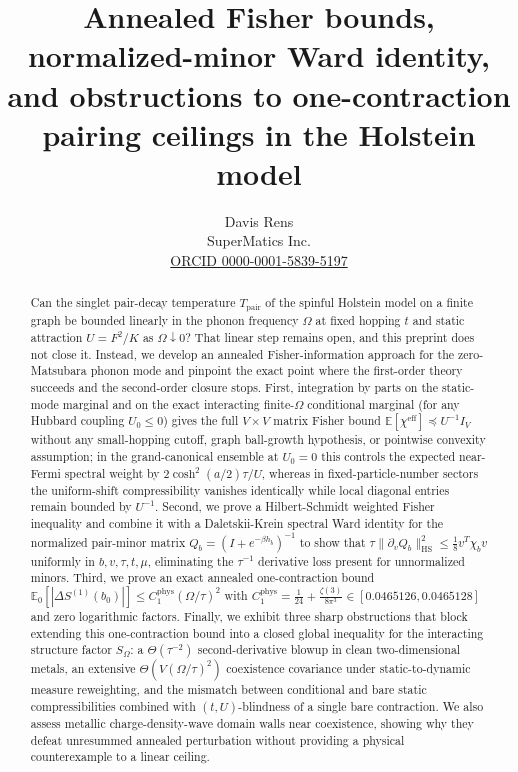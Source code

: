 \documentclass[11pt]{article}
\title{Annealed Fisher bounds, normalized-minor Ward identity, and obstructions to one-contraction pairing ceilings in the Holstein model}
\author{Davis Rens\\SuperMatics Inc.\\\href{https://orcid.org/0000-0001-5839-5197}{ORCID 0000-0001-5839-5197}}
\date{}
\theoremstyle{definition}
\theoremstyle{remark}
\DeclareMathOperator{\HS}{HS}
\DeclareMathOperator{\phys}{phys}
\newcommand{\E}{\mathbb{E}}
\newcommand{\Tpair}{T_{\mathrm{pair}}}
\begin{document}
\maketitle

\begin{abstract}
Can the singlet pair-decay temperature $\Tpair$ of the spinful Holstein model on a finite graph be bounded linearly in the phonon frequency $\Omega$ at fixed hopping $t$ and static attraction $U = F^2/K$ as $\Omega \downarrow 0$? That linear step remains open, and this preprint does not close it. Instead, we develop an annealed Fisher-information approach for the zero-Matsubara phonon mode and pinpoint the exact point where the first-order theory succeeds and the second-order closure stops. First, integration by parts on the static-mode marginal and on the exact interacting finite-$\Omega$ conditional marginal (for any Hubbard coupling $U_0 \le 0$) gives the full $V \times V$ matrix Fisher bound $\E[\chi^{\mathrm{eff}}] \preceq U^{-1} I_V$ without any small-hopping cutoff, graph ball-growth hypothesis, or pointwise convexity assumption; in the grand-canonical ensemble at $U_0 = 0$ this controls the expected near-Fermi spectral weight by $2\cosh^2(a/2)\tau/U$, whereas in fixed-particle-number sectors the uniform-shift compressibility vanishes identically while local diagonal entries remain bounded by $U^{-1}$. Second, we prove a Hilbert-Schmidt weighted Fisher inequality and combine it with a Daletskii-Krein spectral Ward identity for the normalized pair-minor matrix $Q_b = (I+e^{-\beta h_b})^{-1}$ to show that $\tau \|\partial_v Q_b\|_{\HS}^2 \le \frac{1}{8} v^T \chi_b v$ uniformly in $b, v, \tau, t, \mu$, eliminating the $\tau^{-1}$ derivative loss present for unnormalized minors. Third, we prove an exact annealed one-contraction bound $\E_0[|\Delta S^{(1)}(b_0)|] \le C_1^{\phys} (\Omega/\tau)^2$ with $C_1^{\phys} = \frac{1}{24} + \frac{\zeta(3)}{8\pi^3} \in [0.0465126, 0.0465128]$ and zero logarithmic factors. Finally, we exhibit three sharp obstructions that block extending this one-contraction bound into a closed global inequality for the interacting structure factor $S_\Omega$: a $\Theta(\tau^{-2})$ second-derivative blowup in clean two-dimensional metals, an extensive $\Theta(V(\Omega/\tau)^2)$ coexistence covariance under static-to-dynamic measure reweighting, and the mismatch between conditional and bare static compressibilities combined with $(t,U)$-blindness of a single bare contraction. We also assess metallic charge-density-wave domain walls near coexistence, showing why they defeat unresummed annealed perturbation without providing a physical counterexample to a linear ceiling.
\end{abstract}
\end{document}
